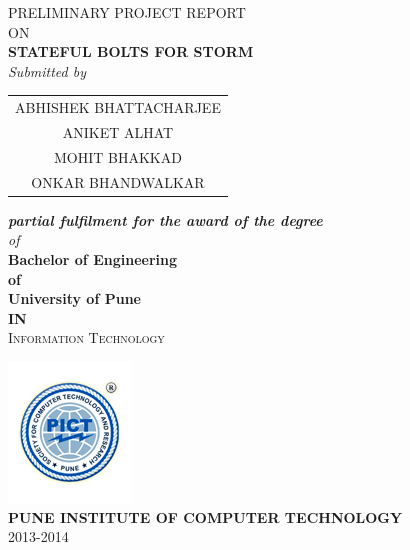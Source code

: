 \begin{titlepage}
\begin{center}
\thispagestyle{empty}

\textsc{PRELIMINARY PROJECT REPORT}\\[3mm]
\textsc{ON}\\[3mm]
{\Large \textsc{\textbf{STATEFUL BOLTS FOR STORM}}}\\[5mm]
\vspace*{10mm}
{\small \textit{Submitted by}}\\[3mm]
\vspace*{10mm}
\begin{tabular}{c} 
ABHISHEK BHATTACHARJEE\\
ANIKET ALHAT\\
MOHIT BHAKKAD\\
ONKAR BHANDWALKAR\\
\end{tabular} 
\vspace*{8mm}

{\textbf{\textit{partial fulfilment for the award of the degree}}}\\[14mm]
{\textit{of}} \\[5mm]
{\textbf{Bachelor of Engineering}}  \\[4mm]
{\textbf{of}}  \\[4mm]
{\textbf{University of Pune}}  \\[4mm]
{\textbf{IN}}  \\[4mm]
{\textsc{Information Technology}}  \\[4mm]
\vspace*{4mm} 

\includegraphics[scale=.5]{../img/logo} \\[2mm]
{\textbf{PUNE INSTITUTE OF COMPUTER TECHNOLOGY}}\\[3mm]
{\textsc{2013-2014}}
\end{center}
\end{titlepage}
